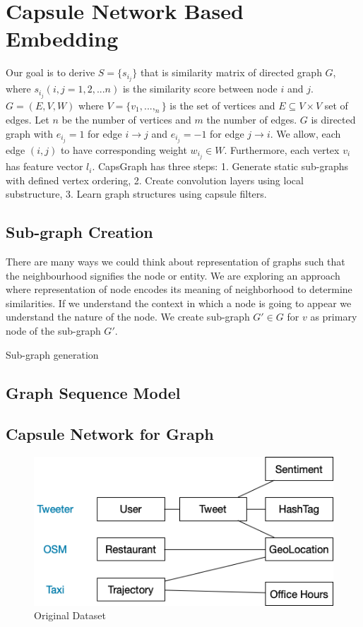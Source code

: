 \section{Capsule Network Based Embedding}
Our goal is to derive $ S= \{ s_i_j \}$ that is similarity matrix of directed graph $ G $, where  $ s_i_j (i, j=1, 2, ... n) $ is the similarity score between node $i$ and $j$. $G=(E,V,W)$ where $V=\{ v_1,...,_n \} $ is the set of vertices and  $E  \subseteq V \times V$ set of edges. Let $ n $ be the number of vertices and $ m $ the number of edges. $G$ is directed graph with $e_i_j=1$ for edge $i \to j$ and $e_i_j=-1$ for edge $j \to i$. We allow, each edge $(i,j)$ to have corresponding weight $w_i_j \in W$. Furthermore, each vertex $v_i$ has feature vector $l_i$.
CapsGraph has three steps: 1. Generate static sub-graphs with defined vertex ordering, 2. Create convolution layers using local substructure, 3. Learn graph structures using capsule filters.
\subsection{Sub-graph Creation}

There are many ways we could think about representation of graphs such that the neighbourhood signifies the node or entity. We are exploring an approach where representation of node encodes its meaning of neighborhood to determine similarities. If we understand the context in which a node is going to appear we understand the nature of the node.
We create sub-graph $G' \in G $ for $v$ as primary node of the sub-graph $G'$.  
\begin{algorithm}[H]
\SetAlgoLined
\caption{Sub-graph generation}
\end{algorithm}

\subsection{Graph Sequence Model}

\subsection{Capsule Network for Graph}

\begin{figure}[!htbp]
  \centering
  \includegraphics[width=\linewidth,height=\textheight,keepaspectratio]{images/Sample_Data}
  \caption{Original Dataset}
  \label{sample_data}
\end{figure}

